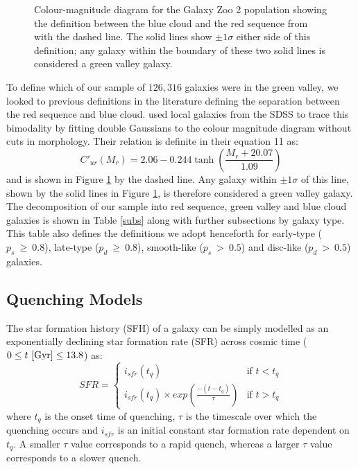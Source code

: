 \documentclass{mn2e}
\begin{document}
\begin{figure}
\caption{Colour-magnitude diagram for the Galaxy Zoo 2 population showing the definition between the blue cloud and the red sequence from \citet{Baldry04} with the dashed line. The solid lines show $\pm 1\sigma$ either side of this definition; any galaxy within the boundary of these two solid lines is considered a green valley galaxy.}
\label{CMGV}
\end{figure}

To define which of our sample of $126, 316$ galaxies were in the green valley, we looked to previous definitions in the literature defining the separation between the red sequence and blue cloud. \citet{Baldry04} used local galaxies from the SDSS to trace this bimodality by fitting double Gaussians to the colour magnitude diagram without cuts in morphology. Their relation is definite in their equation 11 as:
\begin{equation}
C'_{ur}(M_{r}) = 2.06 - 0.244 \tanh \left( \frac{M_r + 20.07}{1.09}\right)
\end{equation}
and is shown in Figure \ref{CMGV} by the dashed line. Any galaxy within $\pm 1\sigma$ of this line, shown by the solid lines in Figure \ref{CMGV}, is therefore considered a green valley galaxy. The decomposition of our sample into red sequence, green valley and blue cloud galaxies is shown in Table \ref{subs} along with further subsections by galaxy type. This table also defines the definitions we adopt henceforth for early-type ($p_s~ \geq~0.8$), late-type ($p_d~ \geq~0.8$), smooth-like ($p_s~ >~0.5$) and disc-like ($p_d~ >~0.5$) galaxies. 


\subsection{Quenching Models}\label{quench}
The star formation history (SFH) of a galaxy can be simply modelled as an exponentially declining star formation rate (SFR) across cosmic time ($0 \leq t ~\rm{[Gyr]} \leq 13.8$) as:
\begin{equation}\label{sfh}
SFR =
\begin{cases}
i_{sfr}(t_q) & \text{if } t < t_q \\
i_{sfr}(t_q) \times exp{\left( \frac{-(t-t_{q})}{\tau}\right)} & \text{if } t > t_q 
\end{cases}
\end{equation}
where $t_{q}$ is the onset time of quenching, $\tau$ is the timescale over which the quenching occurs and $i_{sfr}$ is an initial constant star formation rate dependent on $t_q$.  A smaller $\tau$ value corresponds to a rapid quench, whereas a larger $\tau$ value corresponds to a slower quench. 
\end{document}
